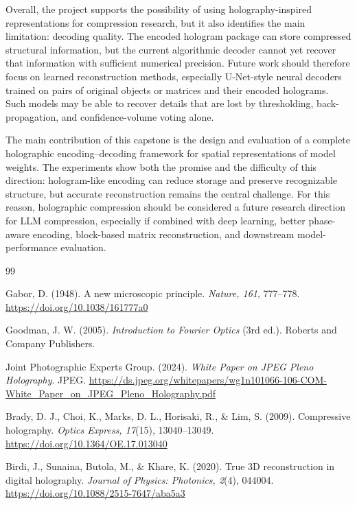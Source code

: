 \documentclass{article}
\begin{document}
\begin{normalsize}
Overall, the project supports the possibility of using holography-inspired representations for compression research, but it also identifies the main limitation: decoding quality. The encoded hologram package can store compressed structural information, but the current algorithmic decoder cannot yet recover that information with sufficient numerical precision. Future work should therefore focus on learned reconstruction methods, especially U-Net-style neural decoders trained on pairs of original objects or matrices and their encoded holograms. Such models may be able to recover details that are lost by thresholding, back-propagation, and confidence-volume voting alone.

The main contribution of this capstone is the design and evaluation of a complete holographic encoding--decoding framework for spatial representations of model weights. The experiments show both the promise and the difficulty of this direction: hologram-like encoding can reduce storage and preserve recognizable structure, but accurate reconstruction remains the central challenge. For this reason, holographic compression should be considered a future research direction for LLM compression, especially if combined with deep learning, better phase-aware encoding, block-based matrix reconstruction, and downstream model-performance evaluation.

\begin{thebibliography}{99}

Gabor, D. (1948). A new microscopic principle. \textit{Nature, 161}, 777--778. 
\url{https://doi.org/10.1038/161777a0}

Goodman, J. W. (2005). \textit{Introduction to Fourier Optics} (3rd ed.). Roberts and Company Publishers.

Joint Photographic Experts Group. (2024). \textit{White Paper on JPEG Pleno Holography}. JPEG. 
\url{https://ds.jpeg.org/whitepapers/wg1n101066-106-COM-White_Paper_on_JPEG_Pleno_Holography.pdf}

Brady, D. J., Choi, K., Marks, D. L., Horisaki, R., \& Lim, S. (2009). Compressive holography. \textit{Optics Express, 17}(15), 13040--13049. 
\url{https://doi.org/10.1364/OE.17.013040}

Birdi, J., Sunaina, Butola, M., \& Khare, K. (2020). True 3D reconstruction in digital holography. \textit{Journal of Physics: Photonics, 2}(4), 044004. 
\url{https://doi.org/10.1088/2515-7647/aba5a3}


\end{thebibliography}
\end{normalsize}
\end{document}
